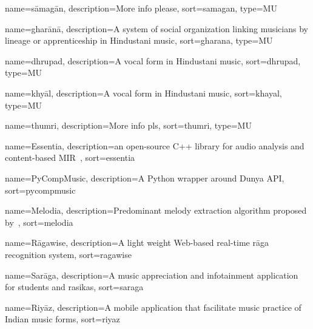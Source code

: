 {
	name={s\={a}mag\={a}n},
	description={More info please},
	sort=samagan,
	type=MU
}

{
	name={ghar\={a}n\={a}},
	description={A system of social organization linking musicians by lineage or apprenticeship in Hindustani music},
	sort=gharana,
	type=MU
}

{
	name={dhrupad},
	description={A vocal form in Hindustani music},
	sort=dhrupad,
	type=MU
}

{
	name={khy\={a}l},
	description={A vocal form in Hindustani music},
	sort=khayal,
	type=MU
}

{
	name={thumri},
	description={More info pls},
	sort=thumri,
	type=MU
}


{
	name={Essentia},
	description={an open-source C++ library for audio analysis and content-based MIR~\citep{essentia}},
	sort=essentia
}

{
	name={PyCompMusic},
	description={A Python wrapper around Dunya API},
	sort=pycompmusic
}

{
	name={Melodia},
	description={Predominant melody extraction algorithm proposed by~\cite{Salamon2012}},
	sort=melodia
}

{
	name={R\={a}gawise},
	description={A light weight Web-based real-time r\={a}ga recognition system},
	sort=ragawise
}	

{
	name={Sar\={a}ga},
	description={A music appreciation and infotainment application for students and rasikas},
	sort=saraga
}

{
	name={Riy\={a}z},
	description={A mobile application that facilitate music practice of Indian music forms},
	sort=riyaz
}


